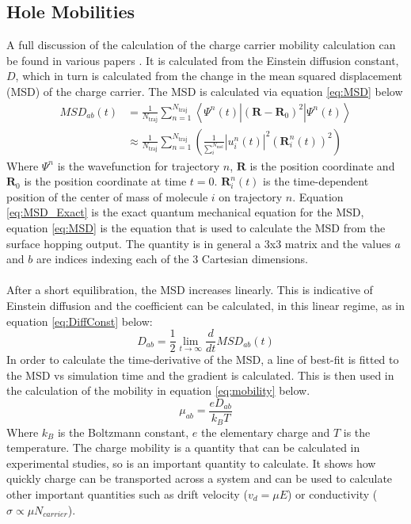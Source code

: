 \subsection{Hole Mobilities}
\label{sect:mobilities}
A full discussion of the calculation of the charge carrier mobility calculation can be found in various papers \cite{Carof2017FSSH,Giannini2018Crossover,Giannini2019}. It is calculated from the Einstein diffusion constant, $D$, which in turn is calculated from the change in the mean squared displacement (MSD) of the charge carrier. The MSD is calculated via equation \eqref{eq:MSD} below
\begin{align}
  \label{eq:MSD_Exact}
  MSD_{ab}(t) &= \frac{1}{N_{\text{traj}}} \sum_{n=1}^{N_{\text{traj}}} \left\langle \Psi^{n}(t) | (\mathbf{R} - \mathbf{R}_{0})^2 | \Psi^{n}(t) \right\rangle \\
  &\approx \frac{1}{N_{\text{traj}}} \sum_{n=1}^{N_{\text{traj}}} \left(\frac{1}{\sum_{i}^{N_{\text{mol}}}} \left| u^{n}_{i}(t) \right|^2 (\mathbf{R}_{i}^{n}(t))^2 \right)
  \label{eq:MSD}
\end{align}
Where $\Psi^{n}$ is the wavefunction for trajectory $n$, $\mathbf{R}$ is the position coordinate and $\mathbf{R}_{0}$ is the position coordinate at time $t=0$. $\mathbf{R}_{i}^{n}(t)$ is the time-dependent position of the center of mass of molecule $i$ on trajectory $n$. Equation \eqref{eq:MSD_Exact} is the exact quantum mechanical equation for the MSD, equation \eqref{eq:MSD} is the equation that is used to calculate the MSD from the surface hopping output. The quantity is in general a 3x3 matrix and the values $a$ and $b$ are indices indexing each of the 3 Cartesian dimensions.
\\\\
After a short equilibration, the MSD increases linearly. This is indicative of Einstein diffusion and the coefficient can be calculated, in this linear regime, as in equation \eqref{eq:DiffConst} below:
\begin{equation}
  D_{ab} = \frac{1}{2} \lim_{t \rightarrow \infty} \frac{d}{dt}MSD_{ab}(t)
  \label{eq:DiffConst}
\end{equation}
In order to calculate the time-derivative of the MSD, a line of best-fit is fitted to the MSD vs simulation time and the gradient is calculated. This is then used in the calculation of the mobility in equation \eqref{eq:mobility} below.
\begin{equation}
	\mu_{ab} = \frac{e D_{ab}}{k_{B} T}
	\label{eq:mobility}
\end{equation}
Where $k_{B}$ is the Boltzmann constant, $e$ the elementary charge and $T$ is the temperature. The charge mobility is a quantity that can be calculated in experimental studies, so is an important quantity to calculate. It shows how quickly charge can be transported across a system and can be used to calculate other important quantities such as drift velocity ($v_{d} = \mu E$) or conductivity ($\sigma \propto \mu N_{carrier}$).
